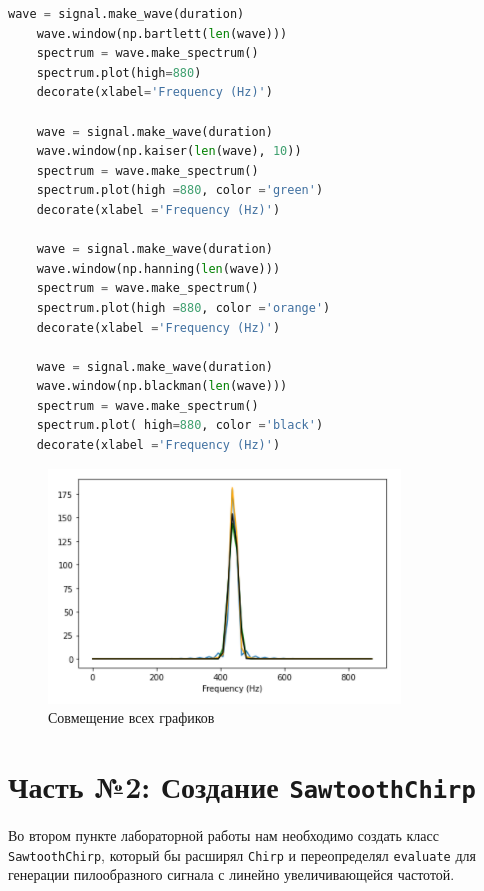 \documentclass[a4paper]{article}
\begin{document}
\begin{lstlisting}[language=Python, caption= Совмещение всех графиков]
    wave = signal.make_wave(duration)
    wave.window(np.bartlett(len(wave)))
    spectrum = wave.make_spectrum()
    spectrum.plot(high=880)
    decorate(xlabel='Frequency (Hz)')
    
    wave = signal.make_wave(duration)
    wave.window(np.kaiser(len(wave), 10))
    spectrum = wave.make_spectrum()
    spectrum.plot(high =880, color ='green')
    decorate(xlabel ='Frequency (Hz)')
    
    wave = signal.make_wave(duration)
    wave.window(np.hanning(len(wave)))
    spectrum = wave.make_spectrum()
    spectrum.plot(high =880, color ='orange')
    decorate(xlabel ='Frequency (Hz)')
    
    wave = signal.make_wave(duration)
    wave.window(np.blackman(len(wave)))
    spectrum = wave.make_spectrum()
    spectrum.plot( high=880, color ='black')
    decorate(xlabel ='Frequency (Hz)')
\end{lstlisting}               
            
            \begin{figure}[H]
                \centering
                \includegraphics{ex_1_all_in_one.png}
                \caption{Совмещение всех графиков}
                \label{fig:ex_1_all_in_one}
            \end{figure}
    
    \newpage
        \section{Часть №2: Создание \texttt{SawtoothChirp}}
            Во втором пункте лабораторной работы нам необходимо создать класс \texttt{SawtoothChirp}, который бы расширял \texttt{Chirp} и переопределял \texttt{evaluate} для генерации пилообразного сигнала с линейно увеличивающейся частотой.
            
\end{document}
